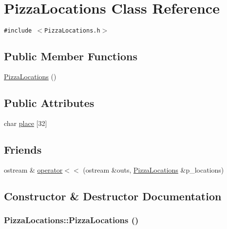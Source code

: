 \hypertarget{class_pizza_locations}{
\section{Pizza\-Locations Class Reference}
\label{class_pizza_locations}
}
{\tt \#include $<$Pizza\-Locations.h$>$}

\subsection*{Public Member Functions}
\begin{CompactItemize}
\item 
\hyperlink{class_pizza_locations_0d6e8ae796b74fb560a202c44b4685fe}{Pizza\-Locations} ()
\end{CompactItemize}
\subsection*{Public Attributes}
\begin{CompactItemize}
\item 
char \hyperlink{class_pizza_locations_247f35efd255fe4af3b63f76e9c58b25}{place} \mbox{[}32\mbox{]}
\end{CompactItemize}
\subsection*{Friends}
\begin{CompactItemize}
\item 
ostream \& \hyperlink{class_pizza_locations_7a5ef62906b8b087fcc29903cd696ef0}{operator$<$$<$} (ostream \&outs, \hyperlink{class_pizza_locations}{Pizza\-Locations} \&p\_\-locations)
\end{CompactItemize}


\subsection{Constructor \& Destructor Documentation}
\hypertarget{class_pizza_locations_0d6e8ae796b74fb560a202c44b4685fe}{
\subsubsection[PizzaLocations]{\setlength{\rightskip}{0pt plus 5cm}Pizza\-Locations::Pizza\-Locations ()}}
\label{class_pizza_locations_0d6e8ae796b74fb560a202c44b4685fe}




